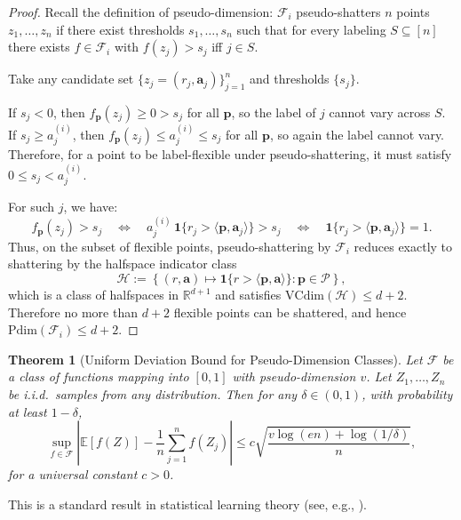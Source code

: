 \documentclass[11pt]{article}
\newtheorem{theorem}{Theorem}
\newcommand{\ba}{\mathbf{a}}
\newcommand{\bp}{\mathbf{p}}
\newcommand{\E}{\mathbb{E}}
\newcommand{\R}{\mathbb{R}}
\newcommand{\cP}{\mathcal{P}}
\begin{document}
\begin{proof}
Recall the definition of pseudo-dimension: $\mathcal{F}_i$ pseudo-shatters $n$ points $z_1, \ldots, z_n$ if there exist thresholds $s_1, \ldots, s_n$ such that for every labeling $S \subseteq [n]$ there exists $f \in \mathcal{F}_i$ with $f(z_j) > s_j$ iff $j \in S$.

Take any candidate set $\{z_j = (r_j, \ba_j)\}_{j=1}^n$ and thresholds $\{s_j\}$.

If $s_j < 0$, then $f_{\bp}(z_j) \ge 0 > s_j$ for all $\bp$, so the label of $j$ cannot vary across $S$. If $s_j \ge a_j^{(i)}$, then $f_{\bp}(z_j) \le a_j^{(i)} \le s_j$ for all $\bp$, so again the label cannot vary. Therefore, for a point to be label-flexible under pseudo-shattering, it must satisfy $0 \le s_j < a_j^{(i)}$.

For such $j$, we have:
\[
f_{\bp}(z_j) > s_j \quad \Longleftrightarrow \quad a_j^{(i)} \, \mathbf{1}\{r_j > \langle \bp, \ba_j \rangle\} > s_j \quad \Longleftrightarrow \quad \mathbf{1}\{r_j > \langle \bp, \ba_j \rangle\} = 1.
\]
Thus, on the subset of flexible points, pseudo-shattering by $\mathcal{F}_i$ reduces exactly to shattering by the halfspace indicator class
\[
\mathcal{H} := \left\{ (r, \ba) \mapsto \mathbf{1}\{r > \langle \bp, \ba \rangle\} : \bp \in \cP \right\},
\]
which is a class of halfspaces in $\R^{d+1}$ and satisfies $\mathrm{VCdim}(\mathcal{H}) \le d + 2$. Therefore no more than $d + 2$ flexible points can be shattered, and hence $\mathrm{Pdim}(\mathcal{F}_i) \le d + 2$.
\end{proof}

\begin{theorem}[Uniform Deviation Bound for Pseudo-Dimension Classes]
\label{thm:pdim-uniform}
Let $\mathcal{F}$ be a class of functions mapping into $[0, 1]$ with pseudo-dimension $v$. Let $Z_1, \ldots, Z_n$ be i.i.d.\ samples from any distribution. Then for any $\delta \in (0, 1)$, with probability at least $1 - \delta$,
\[
\sup_{f \in \mathcal{F}} \left| \E[f(Z)] - \frac{1}{n} \sum_{j=1}^n f(Z_j) \right| \le c \sqrt{\frac{v \log(en) + \log(1/\delta)}{n}},
\]
for a universal constant $c > 0$.
\end{theorem}

This is a standard result in statistical learning theory (see, e.g., \citet{pollard1984convergence}).
\end{document}
